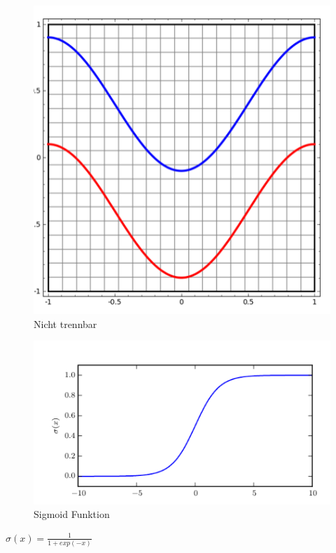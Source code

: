\documentclass{llncs}
\begin{document}
\begin{figure}[htbp] 
	\centering
	\includegraphics[width=1.0\textwidth]{lineartrennbar.png}
	\caption{Nicht trennbar}
	\label{fig:Bild1}
\end{figure}

\begin{figure}[htbp] 
	\centering
	\includegraphics[width=1.0\textwidth]{sigmoid.png}
	\caption{Sigmoid Funktion}
	\label{fig:Bild1}
\end{figure}

\begin{math}
\sigma(x)=\frac{1}{1+exp(-x)}
\end{math}
\end{document}
